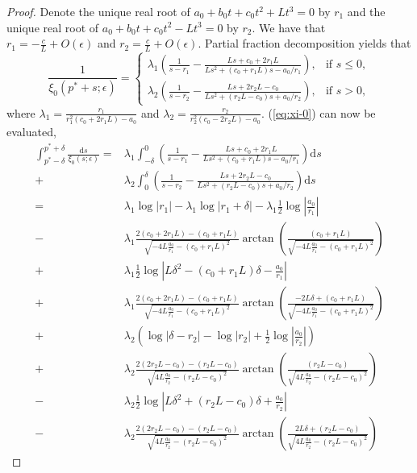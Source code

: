 \documentclass[11pt,a4paper]{article}
\numberwithin{equation}{section}
\begin{document}
\begin{proof}
    Denote the unique real root of $a_0+b_0t+c_0t^2+Lt^3=0$ by $r_1$ and the unique real root of $a_0+b_0t+c_0t^2-Lt^3=0$ by $r_2$. We have that $r_1=-\frac{c}{L}+O(\epsilon)$ and $r_2=\frac{c}{L}+O(\epsilon)$.   
    Partial fraction decomposition yields that
    $$
    \frac{1}{\xi_0(p^*+s;\epsilon)}=\begin{cases}
        \lambda_1\left(\frac{1}{s-r_1}-\frac{Ls+c_0+2r_1L}{Ls^{2}+\left(c_0+r_1L\right)s-a_0/r_1}\right),&\text{if } s\le 0,\\
        \lambda_2\left(\frac{1}{s-r_{2}}-\frac{Ls+2r_{2}L-c_0}{Ls^{2}+\left(r_{2}L-c_0\right)s+a_0/r_{2}}\right),&\text{if } s> 0,
    \end{cases}
    $$
    where $\lambda_1=\frac{r_1}{r_1^{2}\left(c_0+2r_1L\right)-a_0}$ and $\lambda_2=\frac{r_{2}}{r_{2}^{2}\left(c_0-2r_{2}L\right)-a_0}$. (\ref{eq:xi-0}) can now be evaluated,
    \begin{align*}
        \int_{p^*-\delta}^{p^*+\delta}\frac{\mathrm{d}s}{\xi_0(s;\epsilon)}=&\lambda_1\int_{-\delta}^0\left(\frac{1}{s-r_1}-\frac{Ls+c_0+2r_1L}{Ls^{2}+\left(c_0+r_1L\right)s-a_0/r_1}\right)\mathrm{d}s\\
        +&\lambda_2\int_0^{\delta}\left(\frac{1}{s-r_{2}}-\frac{Ls+2r_{2}L-c_0}{Ls^{2}+\left(r_{2}L-c_0\right)s+a_0/r_{2}}\right)\mathrm{d}s\\
        =&\lambda_1\log\left|r_{1}\right|-\lambda_1\log\left|r_{1}+\delta\right|-\lambda_1\frac{1}{2}\log\left|\frac{a_{0}}{r_{1}}\right|\\-&\lambda_1\frac{2(c_{0}+2r_{1}L)-\left(c_{0}+r_{1}L\right)}{\sqrt{-4L\frac{a_{0}}{r_{1}}-\left(c_{0}+r_{1}L\right)^{2}}}\arctan\left(\frac{\left(c_{0}+r_{1}L\right)}{\sqrt{-4L\frac{a_{0}}{r_{1}}-\left(c_{0}+r_{1}L\right)^{2}}}\right)\\+&\lambda_1\frac{1}{2}\log\left|L\delta^{2}-\left(c_{0}+r_{1}L\right)\delta-\frac{a_{0}}{r_{1}}\right|\\+&\lambda_1\frac{2(c_{0}+2r_{1}L)-\left(c_{0}+r_{1}L\right)}{\sqrt{-4L\frac{a_{0}}{r_{1}}-\left(c_{0}+r_{1}L\right)^{2}}}\arctan\left(\frac{-2L\delta+\left(c_{0}+r_{1}L\right)}{\sqrt{-4L\frac{a_{0}}{r_{1}}-\left(c_{0}+r_{1}L\right)^{2}}}\right)\\
        +&\lambda_2\left(\log\left|\delta-r_{2}\right|-\log\left|r_{2}\right|+\frac{1}{2}\log\left|\frac{a_{0}}{r_{2}}\right|\right)\\+&\lambda_2\frac{2\left(2r_{2}L-c_{0}\right)-\left(r_{2}L-c_{0}\right)}{\sqrt{4L\frac{a_{0}}{r_{2}}-\left(r_{2}L-c_{0}\right)^{2}}}\arctan\left(\frac{\left(r_{2}L-c_{0}\right)}{\sqrt{4L\frac{a_{0}}{r_{2}}-\left(r_{2}L-c_{0}\right)^{2}}}\right)\\-&\lambda_2\frac{1}{2}\log\left|L\delta^{2}+\left(r_{2}L-c_{0}\right)\delta+\frac{a_{0}}{r_{2}}\right|\\-&\lambda_2\frac{2\left(2r_{2}L-c_{0}\right)-\left(r_{2}L-c_{0}\right)}{\sqrt{4L\frac{a_{0}}{r_{2}}-\left(r_{2}L-c_{0}\right)^{2}}}\arctan\left(\frac{2L\delta+\left(r_{2}L-c_{0}\right)}{\sqrt{4L\frac{a_{0}}{r_{2}}-\left(r_{2}L-c_{0}\right)^{2}}}\right)

\end{align*}
\end{proof}
\end{document}
